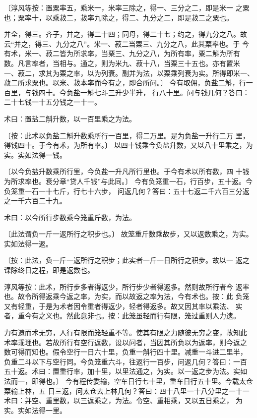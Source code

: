 \documentclass[a4paper,12pt,UTF8,twoside]{ctexbook}
\begin{document}
〔淳风等按：置粟率五，乘米一，米率三除之，得一、三分之二，即是米一 之粟也；粟率十，以乘菽二，菽率九除之，得二、九分之二，即是菽二之粟也。

并全，得三。齐子，并之，得二十四；同母，得二十七；约之，得九分之八。故 云“并之，得三、九分之八”。米一、菽二当粟三、九分之八，此其粟率也。于 今有术，米一、菽二皆为所求率，当粟三、九分之八，为所有率，粟二斛为所有 数。凡言率者，当相与。通之，则为米九、菽十八，当粟三十五也。亦有置米 一、菽二，求其为粟之率，以为列衰。副并为法，以粟乘列衰为实。所得即米一、 菽二所求粟也。以米、菽本率而今有之，即合所问。〕 今有取佣，负盐二斛，行一百里，与钱四十。今负盐一斛七斗三升少半升， 行八十里。问与钱几何？答曰：二十七钱一十五分钱之一十一。

术曰：置盐二斛升数，以一百里乘之为法。

〔按：此术以负盐二斛升数乘所行一百里，得二万里。是为负盐一升行二万 里，得钱四十。于今有术，为所有率。〕 以四十钱乘今负盐升数，又以八十里乘之，为实。实如法得一钱。

〔以今负盐升数乘所行里，今负盐一升凡所行里也。于今有术以所有数，四 十钱为所求率也。衰分章“贷人千钱”与此同。〕 今有负笼重一石，行百步，五十返。今负笼重一石一十七斤，行七十六步， 问返几何？答曰：五十七返二千六百三分返之一千六百二十九。

术曰：以今所行步数乘今笼重斤数，为法。

〔此法谓负一斤一返所行之积步也。〕 故笼重斤数乘故步，又以返数乘之，为实。实如法得一返。

〔按：此法，负一斤一返所行之积步；此实者一斤一日所行之积步。故以一 返之课除终日之程，即是返数也。

淳风等按：此术，所行步多者得返少，所行步少者得返多。然则故所行者今 返率也。故令所得返乘今返之率，为实，而以故返之率为法，今有术也。按：此 负笼又有轻重，于是为术者因令重者得返少，轻者得返多。故又因其率以乘法、 实者，重今有之义也。然此意非也。按：此笼虽轻而行有限，笼过重则人力遗。

力有遗而术无穷，人行有限而笼轻重不等。使其有限之力随彼无穷之变，故知此 术率乖理也。若故所行有空行返数，设以问者，当因其所负以为返率，则今返之 数可得而知也。假令空行一日六十里，负重一斛行四十里。减重一斗进二里半， 负重二斗以下与空行同。今负笼重六斗，往返行一百步，问返几何？答曰：一百 五十返。术曰：置重行率，加十里，以里法通之，为实。以一返之步为法。实如 法而一，即得也。〕 今有程传委输，空车日行七十里，重车日行五十里。今载太仓粟输上林，五 日三返，问太仓去上林几何？答曰：四十八里一十八分里之一十一 术曰：并空、重里数，以三返乘之，为法。令空、重相乘，又以五日乘之， 为实。实如法得一里。
\end{document}
